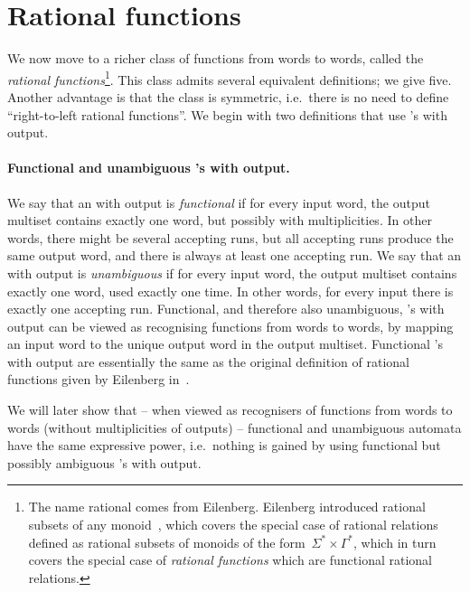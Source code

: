 \section{Rational functions} We now move to a richer class of functions from words to words, called the \emph{rational functions}\footnote{The name rational comes from Eilenberg. Eilenberg introduced rational subsets of any monoid~\cite[Chapter VII]{Eilenberg:1974vl}, which covers the special case of rational relations~\cite[Chapter IX]{Eilenberg:1974vl} defined  as rational subsets of monoids of the form~$\Sigma^* \times \Gamma^*$, which in turn covers the special case of \emph{rational functions} which are functional rational relations. }.  This class admits several equivalent definitions; we give five.  Another advantage is that the class is symmetric, i.e.~there is no need to define ``right-to-left rational functions''. We begin with two definitions that use \nfa's with output.

\paragraph*{Functional and unambiguous \nfa's with output.}
We say that  an  \nfa with output  is \emph{functional} if for every input word, the output multiset contains exactly one word, but possibly with multiplicities.  In other words,  there might be several accepting runs, but all accepting runs produce the same output word, and there is always at least one accepting run. 
We say that an \nfa with output  is \emph{unambiguous} if for every input word, the output multiset contains exactly one word, used exactly one time.   In other words, for every input there is exactly one accepting run. Functional, and therefore also unambiguous,  \nfa's with output can be viewed as recognising functions from words to words, by mapping an input word to the unique output word  in the output multiset. Functional \nfa's with output are essentially the same as the original definition of rational functions given by Eilenberg in~\cite[Chapter IX]{Eilenberg:1974vl}.

We will later show that -- when viewed as recognisers of functions from words to words (without multiplicities of outputs) --  functional and unambiguous automata have the same expressive power, i.e.~nothing is gained by using functional but possibly ambiguous \nfa's with output. 


